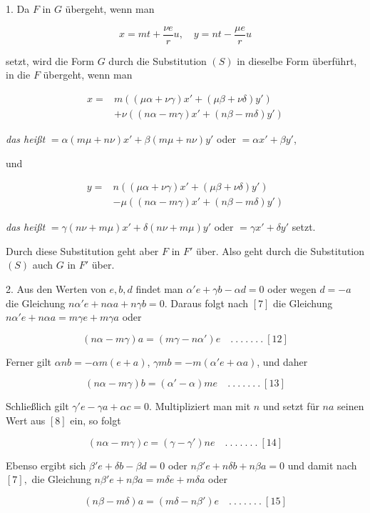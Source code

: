 1. Da $F$ in $G$ übergeht, wenn man

\[
x=mt+\frac{\nu e}{r}u,\quad y=nt-\frac{\mu e}{r}u
\]

setzt, wird die Form $G$ durch die Substitution $(S)$ in dieselbe Form überführt, in die $F$ übergeht, wenn man

\[
\begin{aligned}x={}&m((\mu\alpha+\nu\gamma)x'+(\mu\beta+\nu\delta)y')\\&+\nu((n\alpha-m\gamma)x'+(n\beta-m\delta)y')\end{aligned}
\]

\emph{das heißt} $=\alpha(m\mu+n\nu)x'+\beta(m\mu+n\nu)y'$ oder $=\alpha x'+\beta y'$,

und

\[
\begin{aligned}y={}&n((\mu\alpha+\nu\gamma)x'+(\mu\beta+\nu\delta)y')\\&-\mu((n\alpha-m\gamma)x'+(n\beta-m\delta)y')\end{aligned}
\]

\emph{das heißt} $=\gamma(n\nu+m\mu)x'+\delta(n\nu+m\mu)y'$ oder $=\gamma x'+\delta y'$ setzt.


Durch diese Substitution geht aber $F$ in $F'$ über. Also geht durch die Substitution $(S)$ auch $G$ in $F'$ über.

2. Aus den Werten von $e,b,d$ findet man $\alpha'e+\gamma b-\alpha d=0$ oder wegen $d=-a$ die Gleichung $n\alpha'e+n\alpha a+n\gamma b=0$. Daraus folgt nach $[7]$ die Gleichung $n\alpha'e+n\alpha a=m\gamma e+m\gamma a$ oder

\[
(n\alpha-m\gamma)a=(m\gamma-n\alpha')e\quad .\ .\ .\ .\ .\ .\ .\ [12]
\]

Ferner gilt $\alpha nb=-\alpha m(e+a)$, $\gamma mb=-m(\alpha'e+\alpha a)$, und daher

\[
(n\alpha-m\gamma)b=(\alpha'-\alpha)me\quad .\ .\ .\ .\ .\ .\ .\ [13]
\]

Schließlich gilt $\gamma'e-\gamma a+\alpha c=0$. Multipliziert man mit $n$ und setzt für $na$ seinen Wert aus $[8]$ ein, so folgt

\[
(n\alpha-m\gamma)c=(\gamma-\gamma')ne\quad .\ .\ .\ .\ .\ .\ .\ [14]
\]

Ebenso ergibt sich $\beta'e+\delta b-\beta d=0$ oder $n\beta'e+n\delta b+n\beta a=0$ und damit nach $[7],$ die Gleichung $n\beta'e+n\beta a=m\delta e+m\delta a$ oder

\[
(n\beta-m\delta)a=(m\delta-n\beta')e\quad .\ .\ .\ .\ .\ .\ .\ [15]
\]

